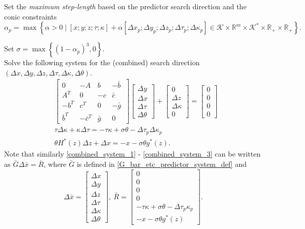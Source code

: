 \documentclass[11pt]{article}
\theoremstyle{definition}
\theoremstyle{plain}
\begin{document}
Set the \textit{maximum step-length} based on the predictor search direction and the conic constraints
\[\alpha_p = \max\left\{ \alpha > 0 \mid [x; y; z; \tau;\kappa] + \alpha [\Delta x_p; \Delta y_p; \Delta z_p; \Delta \tau_p; \Delta \kappa_p] \in \mathcal{K} \times \mathbb{R}^m \times \mathcal{K}^* \times \mathbb{R}_+ \times \mathbb{R}_+
 \right\}. \]

Set $\sigma = \max\left\{(1-\alpha_p)^3, 0\right\}$. \\

Solve the following system for the (combined) search direction $(\Delta x, \Delta y, \Delta z, \Delta \tau, \Delta \kappa, \Delta \theta)$.
\begin{align}
& \begin{bmatrix}
0 & -A & b & -\bar b\ \\ 
A^T & 0 & -c & \bar c \\
-b^T & c^T& 0 & -\bar g \\
\bar b^T & -\bar c^T & \bar g & 0
\end{bmatrix}
\begin{bmatrix}
\Delta y \\ \Delta x \\ \Delta \tau \\ \Delta \theta
\end{bmatrix} + 
\begin{bmatrix}
0 \\ \Delta z \\ \Delta \kappa \\ 0 
\end{bmatrix} = \begin{bmatrix}
0\\0\\0\\0
\end{bmatrix} \label{combined_system_1}\\[1ex]
& \tau \Delta \kappa + \kappa \Delta \tau = - \tau \kappa + \sigma \theta - \Delta \tau_p \Delta \kappa_p \label{combined_system_2}\\[1ex]
& \theta H^*(z)\Delta z + \Delta x = -x - \sigma \theta g^*(z). \label{combined_system_3}
\end{align}
Note that similarly \eqref{combined_system_1} - \eqref{combined_system_3} can be written as $\bar G \Delta \bar x = \bar R$, where $\bar G$ is defined in \eqref{G_bar_etc_predictor_system_def} and 
\[\Delta \bar x =  \begin{bmatrix}
\Delta{x}\\ \Delta{y}\\ \Delta{z}\\ \Delta{\tau}\\ \Delta{\kappa}\\ \Delta{\theta}
\end{bmatrix},\ \bar R = \begin{bmatrix}
0\\0\\0\\0\\-\tau\kappa + \sigma\theta - \Delta\tau_p\kappa_p \\[0.8ex] -x - \sigma\theta g^*(z)
	\end{bmatrix}. \]
\end{document}
